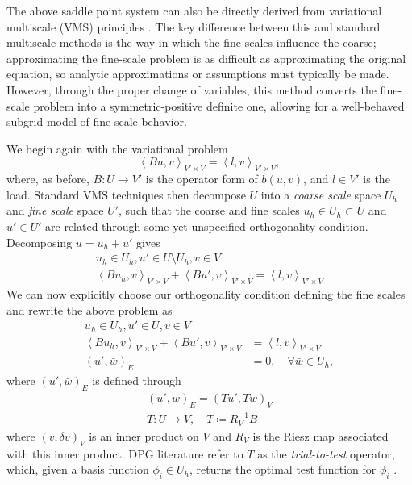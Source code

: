 \documentclass[final,leqno]{siamltex}
\newcommand{\LRp}[1]{\left( #1 \right)}
\newcommand{\LRa}[1]{\left\langle #1 \right\rangle}
\begin{document}
The above saddle point system can also be directly derived from variational multiscale (VMS) principles \cite{VMS1,VMS2}.  The key difference between this and standard multiscale methods is the way in which the fine scales influence the coarse; approximating the fine-scale problem is as difficult as approximating the original equation, so analytic approximations or assumptions must typically be made.  However, through the proper change of variables, this method converts the fine-scale problem into a symmetric-positive definite one, allowing for a well-behaved subgrid model of fine scale behavior.

We begin again with the variational problem
\[
\LRa{Bu,v}_{V'\times V} = \LRa{l,v}_{V'\times V},
\]
where, as before, $B: U\rightarrow V'$ is the operator form of $b(u,v)$, and $l \in V'$ is the load.  Standard VMS techniques then decompose $U$ into a \textit{coarse scale} space $U_h$ and \textit{fine scale} space $U'$, such that the coarse and fine scales $u_h \in U_h \subset U$ and $u' \in U'$ are related through some yet-unspecified orthogonality condition.  Decomposing $u = u_h + u'$ gives 
\begin{align*}
u_h \in U_h, u' \in U\setminus U_h, v \in V\\
\LRa{Bu_h,v}_{V'\times V} + \LRa{Bu',v}_{V'\times V} = \LRa{l,v}_{V'\times V}
\end{align*}
We can now explicitly choose our orthogonality condition defining the fine scales and rewrite the above problem as 
\begin{align*}
u_h \in U_h, u' \in U, v \in V\\
\LRa{Bu_h,v}_{V'\times V} + \LRa{Bu',v}_{V'\times V} &= \LRa{l,v}_{V'\times V}\\
\LRp{u',\bar{w}}_E &= 0, \quad \forall \bar{w} \in U_h,
\end{align*}
where $\LRp{u',\bar{w}}_E$ is defined through
\begin{align*}
\LRp{u',\bar{w}}_E = \LRp{Tu',T\bar{w}}_V\\
T:U\rightarrow V, \quad T \coloneqq R_V^{-1} B
\end{align*}
where $\LRp{v,\delta v}_V$ is an inner product on $V$ and $R_V$ is the Riesz map associated with this inner product.  DPG literature refer to $T$ as the \textit{trial-to-test} operator, which, given a basis function $\phi_i \in U_h$, returns the optimal test function for $\phi_i$ \cite{DPG2}.  
\end{document}
